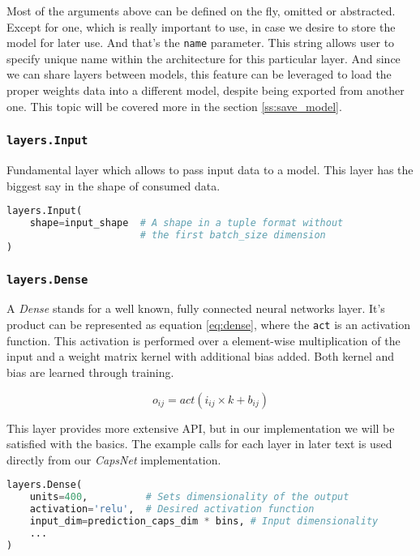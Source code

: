 Most of the arguments above can be defined on the fly, omitted or abstracted. Except for one, which is really important to use, in case we desire to store the model for later use. And that's the \texttt{name} parameter. This string allows user to specify unique name within the architecture for this particular layer. And since we can share layers between models, this feature can be leveraged to load the proper weights data into a different model, despite being exported from another one. This topic will be covered more in the section \ref{ss:save_model}.

\subsubsection{\texttt{layers.Input}}

Fundamental layer which allows to pass input data to a model. This layer has the biggest say in the shape of consumed data.

\begin{lstlisting}[language=Python, caption=Input layer]
layers.Input(
    shape=input_shape  # A shape in a tuple format without
                       # the first batch_size dimension
)
\end{lstlisting}

\subsubsection{\texttt{layers.Dense}}

A \textit{Dense} stands for a well known, fully connected neural networks layer. It's product can be represented as equation \ref{eq:dense}, where the \texttt{act} is an activation function. This activation is performed over a element-wise multiplication of the input and a weight matrix kernel with additional bias added. Both kernel and bias are learned through training.

\begin{equation}
    o_{ij} = act(i_{ij} \times k + b_{ij})
    \label{eq:dense}
\end{equation}

This layer provides more extensive API, but in our implementation we will be satisfied with the basics. The example calls for each layer in later text is used directly from our \textit{CapsNet} implementation.

\begin{lstlisting}[language=Python, caption=Dense layer]
layers.Dense(
    units=400,          # Sets dimensionality of the output
    activation='relu',  # Desired activation function
    input_dim=prediction_caps_dim * bins, # Input dimensionality
    ...
)
\end{lstlisting}

